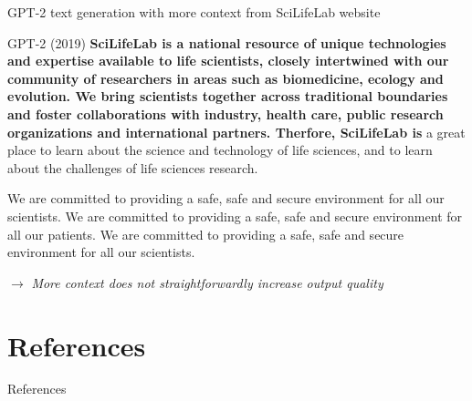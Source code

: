 \documentclass[10pt]{beamer}
\newcommand{\remark}[1]{{\par \color{scGrape} \ensuremath{\rightarrow} \emph{#1}}}
\begin{document}
\begin{frame}{GPT-2 text generation with more context from SciLifeLab website}
	
	\begin{alertblock}{GPT-2 (2019) }
		\small
		\textbf{SciLifeLab is a national resource of unique technologies and expertise available to life scientists, closely intertwined with our community of researchers in areas such as biomedicine, ecology and evolution. We bring scientists together across traditional boundaries and foster collaborations with industry, health care, public research organizations and international partners. Therfore, SciLifeLab is}  a great place to learn about the science and technology of life sciences, and to learn about the challenges of life sciences research.
		
		We are committed to providing a safe, safe and secure environment for all our scientists. We are committed to providing a safe, safe and secure environment for all our patients. We are committed to providing a safe, safe and secure environment for all our scientists.
	\end{alertblock}
	\remark{More context does not straightforwardly increase output quality}
\end{frame}


\section{References}
\begin{frame}[allowframebreaks]{References}
\begingroup
\renewcommand*{\bibfont}{\footnotesize} 
\printbibliography[heading=none]
\endgroup
\end{frame}
\end{document}
